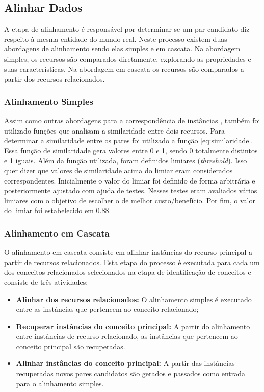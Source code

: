 \subsection{Alinhar Dados}
A etapa de alinhamento é responsável por determinar se um par candidato diz respeito à mesma entidade do mundo real. Neste processo existem duas abordagens de alinhamento sendo elas simples e em cascata. Na abordagem simples, os recursos são comparados diretamente, explorando as propriedades e suas características. Na abordagem em cascata os recursos são comparados a partir dos recursos relacionados.

\subsubsection{Alinhamento Simples}
Assim como outras abordagens para a correspondência de instâncias \cite{zhang2016rimom}, também foi utilizado funções que analisam a similaridade entre dois recursos. Para determinar a similaridade entre os pares foi utilizado a função \ref{eq:similaridade}. Essa função de similaridade gera valores entre 0 e 1, sendo 0 totalmente distintos e 1 iguais. Além da função utilizada, foram definidos limiares (\textit{threshold}). Isso quer dizer que valores de similaridade acima do limiar eram considerados correspondentes. 
Inicialmente o valor do limiar foi definido de forma arbitrária e posteriormente ajustado com ajuda de testes. Nesses testes eram avaliados vários limiares com o objetivo de escolher o de melhor custo/benefício. Por fim, o valor do limiar foi estabelecido em 0.88.


\subsubsection{Alinhamento em Cascata}
O alinhamento em cascata consiste em alinhar instâncias do recurso principal a partir de recursos relacionados. Esta etapa do processo é executada para cada um dos conceitos relacionados selecionados na etapa de identificação de conceitos e consiste de três atividades:
\begin{itemize}
	\item \textbf{Alinhar dos recursos relacionados:} O alinhamento simples é executado entre as instâncias que pertencem ao conceito relacionado;
	
	\item \textbf{Recuperar instâncias do conceito principal:} A partir do alinhamento entre instâncias de recurso relacionado, as instâncias que pertencem ao conceito principal são recuperadas.
	
	\item \textbf{Alinhar instâncias do conceito principal:} A partir das instâncias recuperadas novos pares candidatos são gerados e passados como entrada para o alinhamento simples.
\end{itemize}


